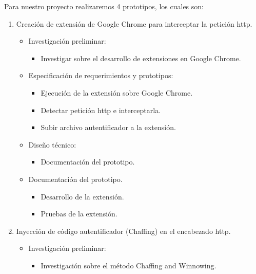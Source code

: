 \documentclass[12pt, a4paper, titlepage]{report}
\begin{document}
        Para nuestro proyecto realizaremos 4 prototipos, los cuales son: 
        \begin{enumerate}
            \item Creación de extensión de Google Chrome para interceptar la petición \acrshort{http}. 
            \begin{itemize}
                \item Investigación preliminar: 
                \begin{itemize}
                    \item Investigar sobre el desarrollo de extensiones en Google Chrome.
                \end{itemize}
                \item Especificación de requerimientos y prototipos:
                \begin{itemize}
                    \item Ejecución de la extensión sobre Google Chrome.
                    \item Detectar petición \acrshort{http} e interceptarla.
                    \item Subir archivo autentificador a la extensión.
                \end{itemize}
                \item Diseño técnico: 
                \begin{itemize}
                    \item Documentación del prototipo.
                \end{itemize}
                \item Documentación del prototipo.
                \begin{itemize}
                    \item Desarrollo de la extensión.
                    \item Pruebas de la extensión.
                \end{itemize}
            \end{itemize}
            \item Inyección de código autentificador (Chaffing) en el encabezado \acrshort{http}. 
            \begin{itemize}
                \item Investigación preliminar: 
                \begin{itemize}
                    \item Investigación sobre el método Chaffing and Winnowing. 
                \end{itemize}

\end{itemize}
\end{enumerate}
\end{document}
